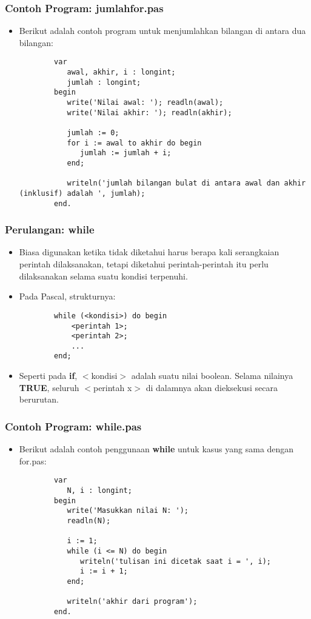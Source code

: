 \documentclass{beamer}
\begin{document}
\begin{frame}[fragile]
\frametitle{Contoh Program: jumlahfor.pas}
\begin{itemize}
	\item Berikut adalah contoh program untuk menjumlahkan bilangan di antara dua bilangan:
	\begin{lstlisting}
		var
		   awal, akhir, i : longint;
		   jumlah : longint;
		begin
		   write('Nilai awal: '); readln(awal);
		   write('Nilai akhir: '); readln(akhir);
		
		   jumlah := 0;
		   for i := awal to akhir do begin
		      jumlah := jumlah + i;
		   end;
		
		   writeln('jumlah bilangan bulat di antara awal dan akhir (inklusif) adalah ', jumlah);
		end.
	\end{lstlisting}
\end{itemize}
\end{frame}

\begin{frame}[fragile]
\frametitle{Perulangan: while}
\begin{itemize}
	\item Biasa digunakan ketika tidak diketahui harus berapa kali serangkaian perintah dilaksanakan, tetapi diketahui perintah-perintah itu perlu dilaksanakan selama suatu kondisi terpenuhi.
	\item Pada Pascal, strukturnya:
	\begin{lstlisting}
		while (<kondisi>) do begin
		    <perintah 1>;
		    <perintah 2>;
		    ...
		end;
	\end{lstlisting}
	\item Seperti pada \textbf{if}, $<$kondisi$>$ adalah suatu nilai boolean. Selama nilainya \textbf{TRUE}, seluruh $<$perintah x$>$ di dalamnya akan dieksekusi secara berurutan.
\end{itemize}
\end{frame}

\begin{frame}[fragile]
\frametitle{Contoh Program: while.pas}
\begin{itemize}
	\item Berikut adalah contoh penggunaan \textbf{while} untuk kasus yang sama dengan for.pas:
	\begin{lstlisting}
		var
		   N, i : longint;
		begin
		   write('Masukkan nilai N: ');
		   readln(N);
		
		   i := 1;
		   while (i <= N) do begin
		      writeln('tulisan ini dicetak saat i = ', i);
		      i := i + 1;
		   end;
		
		   writeln('akhir dari program');
		end.
	\end{lstlisting}
\end{itemize}
\end{frame}
\end{document}
